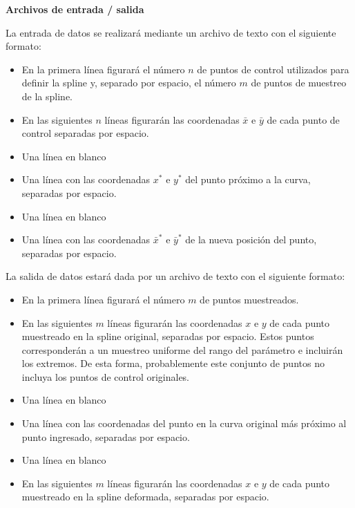 {\bf Archivos de entrada / salida}

La entrada de datos se realizar\'a mediante un archivo de texto con el siguiente formato:
\vspace{-15pt}
\begin{itemize}
  \setlength{\itemsep}{0pt}
  \setlength{\parskip}{0pt}
  \setlength{\parsep}{0pt}
\item En la primera l\'inea figurar\'a el n\'umero $n$ de puntos de control utilizados para definir la spline y, separado por espacio, el n\'umero $m$ de puntos de muestreo de la spline. 
\item En las siguientes $n$ l\'ineas figurar\'an las coordenadas $\bar{x}$ e $\bar{y}$ de cada punto de control separadas por espacio.
\item Una l\'inea en blanco
\item Una l\'inea con las coordenadas $x^*$ e $y^*$ del punto pr\'oximo a la curva, separadas por espacio.
\item Una l\'inea en blanco
\item Una l\'inea con las coordenadas $\bar{x}^*$ e $\bar{y}^*$ de la nueva posici\'on del punto, separadas por espacio.
\end{itemize}

La salida de datos estar\'a dada por un archivo de texto con el siguiente formato:
\vspace{-15pt}
\begin{itemize}
  \setlength{\itemsep}{0pt}
  \setlength{\parskip}{0pt}
  \setlength{\parsep}{0pt}
\item En la primera l\'inea figurar\'a el n\'umero $m$ de puntos muestreados. 
\item En las siguientes $m$ l\'ineas figurar\'an las coordenadas $x$ e $y$ de cada punto muestreado en la spline original, separadas por espacio. Estos puntos corresponder\'an a un muestreo uniforme del rango del par\'ametro e incluir\'an los extremos. De esta forma, probablemente este conjunto de puntos no incluya los puntos de control originales.
\item Una l\'inea en blanco
\item Una l\'inea con las coordenadas del punto en la curva original m\'as pr\'oximo al punto ingresado, separadas por espacio.
\item Una l\'inea en blanco
\item En las siguientes $m$ l\'ineas figurar\'an las coordenadas $x$ e $y$ de cada punto muestreado en la spline deformada, separadas por espacio.
\end{itemize}

%

